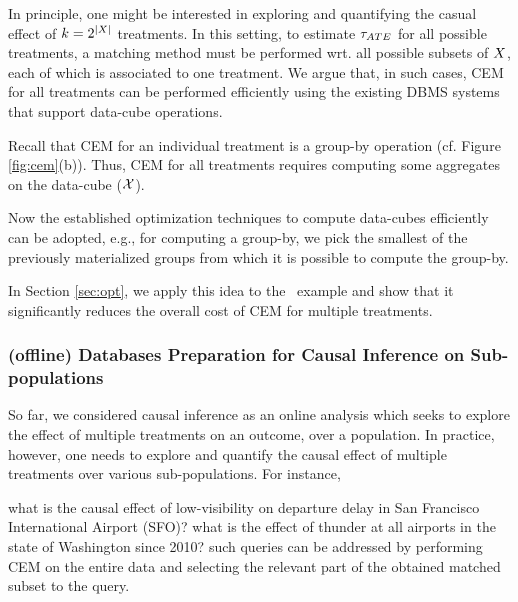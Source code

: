 In principle, one might be interested
in exploring and quantifying the casual effect of $k=2^{|{{X}}|}$ treatments. In this setting, to estimate ${\tau_{ATE}}$ for all possible treatments, a matching method must be performed wrt. all possible subsets of ${{X}}$, each of which is associated to
one treatment. We argue that, in such cases, CEM for all treatments can be performed efficiently using the existing DBMS systems that support data-cube operations.


Recall that CEM for an individual treatment is a group-by operation (cf. Figure \ref{fig:cem}(b)). Thus, CEM for all treatments requires computing some aggregates on the data-cube (${{\mathcal{X}}}$).  Now the established optimization techniques to
 compute data-cubes efficiently  can be adopted, e.g., for computing a group-by, we pick the
 smallest of the previously materialized groups from which it is possible to compute the group-by.
 In Section \ref{sec:opt}, we apply this idea to the \delay \ example and show that
it significantly reduces the overall cost of CEM for multiple treatments.


\subsubsection{(offline) Databases Preparation for Causal Inference on Sub-populations}
\label{sec:dp}

So far, we considered causal inference as an online analysis which seeks to explore the effect of multiple treatments on an outcome, over a
population. In practice, however, one needs to explore and quantify the causal effect of
multiple treatments over various
sub-populations. For instance,  what is the causal
 effect of low-visibility on departure delay in San Francisco International Airport (SFO)?  what is the effect of thunder at all airports in the state of Washington since 2010?
  such queries can be addressed by performing CEM on the entire data and selecting the relevant part of the obtained matched subset to the query.

